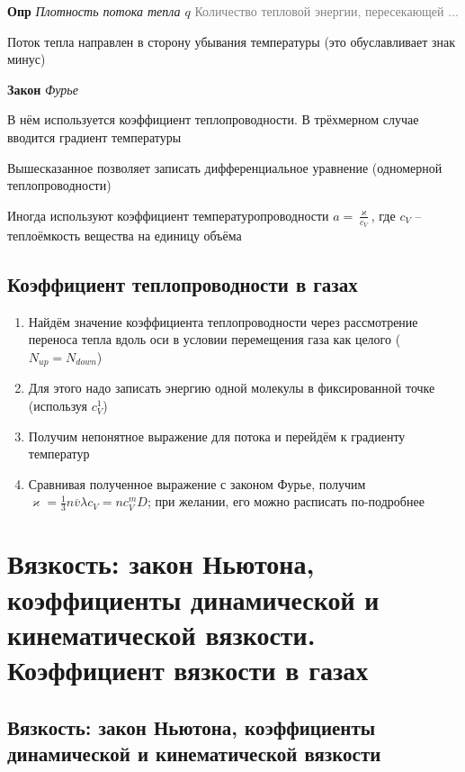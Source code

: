 \documentclass[a4paper, 14pt]{article}
\begin{document}
    \textbf{Опр} \textit{Плотность потока тепла $q$} \textcolor{gray}{Количество тепловой энергии, пересекающей ...}
    
    Поток тепла направлен в сторону убывания температуры (это обуславливает знак минус)
    
    \textbf{Закон} \textit{Фурье}
    
    В нём используется коэффициент теплопроводности.
    В трёхмерном случае вводится градиент температуры
    
    Вышесказанное позволяет записать дифференциальное уравнение (одномерной теплопроводности)
    
    Иногда используют коэффициент температуропроводности $a = \frac{\varkappa}{c_V}$, где $c_V$ -- теплоёмкость
    вещества на единицу объёма
    
    \subsection{Коэффициент теплопроводности в газах}
    
    \begin{enumerate}
        \item Найдём значение коэффициента теплопроводности через рассмотрение переноса тепла вдоль оси в условии
        перемещения газа как целого ($N_{up} = N_{down}$)
        \item Для этого надо записать энергию одной молекулы в фиксированной точке (используя $c^1_V$)
        \item Получим непонятное выражение для потока и перейдём к градиенту температур
        \item Сравнивая полученное выражение с законом Фурье, получим $\varkappa = \frac{1}{3} n \overline{v} \lambda
        c_V = n c^m_V D$; при желании, его можно расписать по-подробнее
    \end{enumerate}
    
    \section{Вязкость: закон Ньютона, коэффициенты динамической и кинематической вязкости.
    Коэффициент вязкости в газах}
    
    \subsection{Вязкость: закон Ньютона, коэффициенты динамической и кинематической вязкости}
    
\end{document}
